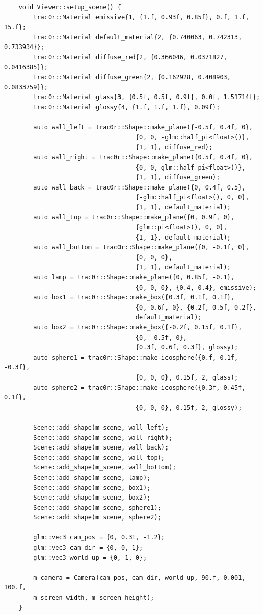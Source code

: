 \documentclass[
  twoside,
  11pt, a4paper,
  footinclude=true,
  headinclude=true,
  cleardoublepage=empty
]{scrreprt}
\begin{document}
\begin{verbatim}
    void Viewer::setup_scene() {
        trac0r::Material emissive{1, {1.f, 0.93f, 0.85f}, 0.f, 1.f, 15.f};
        trac0r::Material default_material{2, {0.740063, 0.742313, 0.733934}};
        trac0r::Material diffuse_red{2, {0.366046, 0.0371827, 0.0416385}};
        trac0r::Material diffuse_green{2, {0.162928, 0.408903, 0.0833759}};
        trac0r::Material glass{3, {0.5f, 0.5f, 0.9f}, 0.0f, 1.51714f};
        trac0r::Material glossy{4, {1.f, 1.f, 1.f}, 0.09f};

        auto wall_left = trac0r::Shape::make_plane({-0.5f, 0.4f, 0},
                                    {0, 0, -glm::half_pi<float>()},
                                    {1, 1}, diffuse_red);
        auto wall_right = trac0r::Shape::make_plane({0.5f, 0.4f, 0},
                                    {0, 0, glm::half_pi<float>()},
                                    {1, 1}, diffuse_green);
        auto wall_back = trac0r::Shape::make_plane({0, 0.4f, 0.5},
                                    {-glm::half_pi<float>(), 0, 0},
                                    {1, 1}, default_material);
        auto wall_top = trac0r::Shape::make_plane({0, 0.9f, 0},
                                    {glm::pi<float>(), 0, 0},
                                    {1, 1}, default_material);
        auto wall_bottom = trac0r::Shape::make_plane({0, -0.1f, 0},
                                    {0, 0, 0},
                                    {1, 1}, default_material);
        auto lamp = trac0r::Shape::make_plane({0, 0.85f, -0.1},
                                    {0, 0, 0}, {0.4, 0.4}, emissive);
        auto box1 = trac0r::Shape::make_box({0.3f, 0.1f, 0.1f},
                                    {0, 0.6f, 0}, {0.2f, 0.5f, 0.2f},
                                    default_material);
        auto box2 = trac0r::Shape::make_box({-0.2f, 0.15f, 0.1f},
                                    {0, -0.5f, 0},
                                    {0.3f, 0.6f, 0.3f}, glossy);
        auto sphere1 = trac0r::Shape::make_icosphere({0.f, 0.1f, -0.3f},
                                    {0, 0, 0}, 0.15f, 2, glass);
        auto sphere2 = trac0r::Shape::make_icosphere({0.3f, 0.45f, 0.1f},
                                    {0, 0, 0}, 0.15f, 2, glossy);

        Scene::add_shape(m_scene, wall_left);
        Scene::add_shape(m_scene, wall_right);
        Scene::add_shape(m_scene, wall_back);
        Scene::add_shape(m_scene, wall_top);
        Scene::add_shape(m_scene, wall_bottom);
        Scene::add_shape(m_scene, lamp); 
        Scene::add_shape(m_scene, box1);
        Scene::add_shape(m_scene, box2);
        Scene::add_shape(m_scene, sphere1);
        Scene::add_shape(m_scene, sphere2);

        glm::vec3 cam_pos = {0, 0.31, -1.2};
        glm::vec3 cam_dir = {0, 0, 1};
        glm::vec3 world_up = {0, 1, 0};

        m_camera = Camera(cam_pos, cam_dir, world_up, 90.f, 0.001, 100.f,
        m_screen_width, m_screen_height);
    }
\end{verbatim} 
\begingroup
{}
\endgroup
\end{document}
